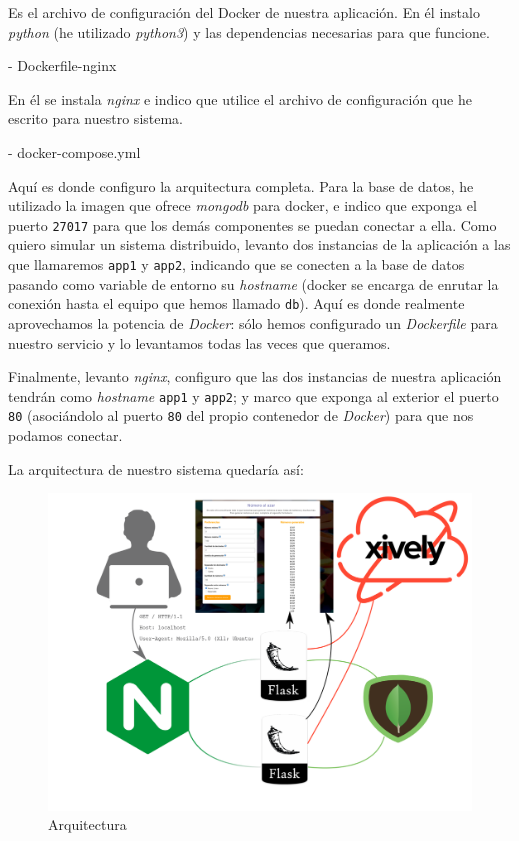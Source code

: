\documentclass{article}
\begin{document}
Es el archivo de configuración del Docker de nuestra aplicación. En él instalo \emph{python} (he utilizado \emph{python3}) y las dependencias necesarias para que funcione.

- Dockerfile-nginx

En él se instala \emph{nginx} e indico que utilice el archivo de configuración que he escrito para nuestro sistema.

- docker-compose.yml

Aquí es donde configuro la arquitectura completa. Para la base de datos, he utilizado la imagen que ofrece \emph{mongodb} para docker, e indico que exponga el puerto \texttt{27017} para que los demás componentes se puedan conectar a ella. Como quiero simular un sistema distribuido, levanto dos instancias de la aplicación a las que llamaremos \texttt{app1} y \texttt{app2}, indicando que se conecten a la base de datos pasando como variable de entorno su \emph{hostname} (docker se encarga de enrutar la conexión hasta el equipo que hemos llamado \texttt{db}). Aquí es donde realmente aprovechamos la potencia de \emph{Docker}: sólo hemos configurado un \emph{Dockerfile} para nuestro servicio y lo levantamos todas las veces que queramos.

Finalmente, levanto \emph{nginx}, configuro que las dos instancias de nuestra aplicación tendrán como \emph{hostname} \texttt{app1} y \texttt{app2}; y marco que exponga al exterior el puerto \texttt{80} (asociándolo al puerto \texttt{80} del propio contenedor de \emph{Docker}) para que nos podamos conectar.

La arquitectura de nuestro sistema quedaría así:

\begin{figure}
\centering
\includegraphics[width=\textwidth]{arquitectura.png}
\caption{Arquitectura}
\end{figure}
\end{document}
